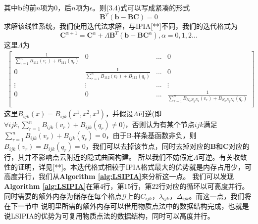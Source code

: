 其中$\mathbf{b}$的前$n$项为$0$，后$n$项为$\epsilon$。则(3.4)式可以写成紧凑的形式
\begin{equation}
    \mathbf{B}^T ( \mathbf{b} - \mathbf{B} \mathbf{C}) = 0    
\end{equation}
求解该线性系统，我们使用迭代法求解，与IPIA[**]不同，我们的迭代格式为
\begin{equation}
\mathbf{C}^{\alpha + 1} = \mathbf{C}^{\alpha} + \Lambda \mathbf{B}^T(\mathbf{b} - \mathbf{B}\mathbf{C}^{\alpha}) , \alpha = 0,1,2...
\end{equation}
这里$\Lambda$为
\begin{equation}
    \begin{split}
        \begin{bmatrix}
            \frac{1}{\sum_{r = 1}^n B_{111}(v_r) +B_{111}(q_r)} & 0 & ... & 0\\
            0 & \frac{1}{\sum_{r = 1}^n B_{112}(v_r) +B_{112}(q_r)} & ... & 0\\
            \vdots & \vdots & ... & \vdots \\
            0 & 0 & ... & \frac{1}{\sum_{r = 1}^n B_{N_xN_yN_z}(v_r) +B_{N_xN_yN_z}(q_r)} \\
        \end{bmatrix}
    \end{split}
\end{equation}
这里$B_{ijk}(x) = B_{ijk}(x^1,x^2,x^3)$，并假设$\Lambda$可逆(即$\forall ijk ,\sum_{r = 1}^n B_{ijk}(v_r) +B_{ijk}(q_r) \neq 0$)，否则认为有某个节点$ijk$满足$\sum_{r = 1}^n B_{ijk}(v_r) +B_{ijk}(q_r) = 0$，由于B-样条基函数非负，则$B_{ijk}(v_r) = B_{ijk}(q_r) = 0$，我们可以去掉该节点，同时去掉对应的$\mathbf{B}$和$\mathbf{C}$对应的行，其并不影响点云附近的隐式曲面构建。
所以我们不妨假定$\Lambda$可逆。有关收敛性的证明，详见[**]。本迭代格式相较于IPIA格式最大的优势就是内存占用少，可高度并行，我们从\textbf{Algorithm \ref{alg:LSIPIA}}来分析这一点。
我们可以发现\textbf{Algorithm \ref{alg:LSIPIA}}在第4行，第15行，第22行对应的循环以可高度并行。同时需要的额外内存为储存在每个格点$\mathcal{G}$上的$C_{ijk}$，$\lambda_{ijk}$，$\Delta_{ijk}$。而这一点，我们将在下一节中
说明里所需的额外内存可以借用物质点法中的数据结构完成，也就是说LSIPIA的优势为可复用物质点法的数据结构，同时可以高度并行。
